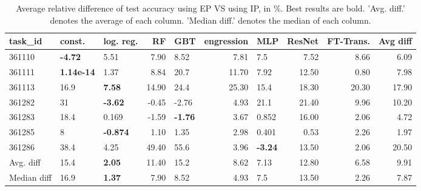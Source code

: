 \begin{table}[ht!]
\centering
\begingroup\footnotesize
\begin{tabular}{lllrlrlrrr}
  \hline
\hline
task\_id & const. & log. reg. & RF & GBT & engression & MLP & ResNet & FT-Trans. & Avg diff \\ 
  \hline
361110 & \textbf{-4.72} & 5.51 & 7.90 & 8.52 & 7.81 & 7.5 & 7.52 & 8.66 & 6.09 \\ 
  361111 & \textbf{1.14e-14} & 1.37 & 8.84 & 20.7 & 11.70 & 7.92 & 12.50 & 0.80 & 7.98 \\ 
  361113 & 16.9 & \textbf{7.58} & 14.90 & 24.4 & 25.30 & 15.4 & 18.30 & 20.30 & 17.90 \\ 
  361282 & 31 & \textbf{-3.62} & -0.45 & -2.76 & 4.93 & 21.1 & 21.40 & 9.96 & 10.20 \\ 
  361283 & 18.4 & 0.169 & -1.59 & \textbf{-1.76} & 3.67 & 0.852 & 16.00 & 2.06 & 4.72 \\ 
  361285 & 8 & \textbf{-0.874} & 1.10 & 1.35 & 2.98 & 0.401 & 0.53 & 2.26 & 1.97 \\ 
  361286 & 38.4 & 4.25 & 49.40 & 55.6 & 3.96 & \textbf{-3.24} & 13.50 & 2.06 & 20.50 \\ 
   \hline
Avg. diff & 15.4 & \textbf{2.05} & 11.40 & 15.2 & 8.62 & 7.13 & 12.80 & 6.58 & 9.91 \\ 
  Median diff & 16.9 & \textbf{1.37} & 7.90 & 8.52 & 4.93 & 7.5 & 13.50 & 2.26 & 7.87 \\ 
   \hline
\hline
\end{tabular}
\endgroup
\caption{Average relative difference of test accuracy using EP VS using IP, in \%. 
                  Best results are bold. 
                  'Avg. diff.' denotes the average of each column.
                  'Median diff.' denotes the median of each column.} 
\label{TABLES/table_results_accuracy_umap_num_and_cat_features_EP_VS_IP}
\end{table}
